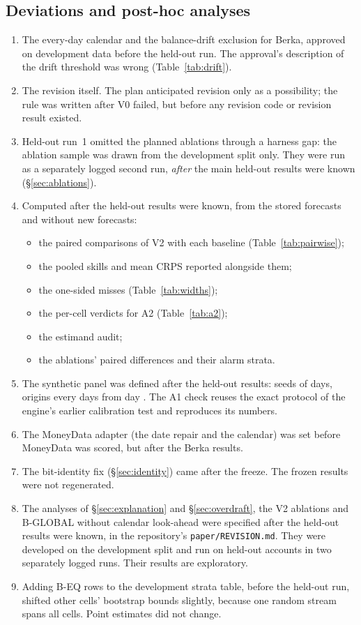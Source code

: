 \subsection{Deviations and post-hoc analyses}
\begin{enumerate}[label=(\arabic*)]
\item The every-day calendar and the balance-drift exclusion for Berka,
  approved on development data before the held-out run. The approval's
  description of the drift threshold was wrong (Table~\ref{tab:drift}).
\item The revision itself. The plan anticipated revision only as a
  possibility; the rule was written after V0 failed, but before any
  revision code or revision result existed.
\item Held-out run~1 omitted the planned ablations through a harness gap:
  the ablation sample was drawn from the development split only. They were
  run as a separately logged second run, \emph{after} the main held-out
  results were known (\S\ref{sec:ablations}).
\item Computed after the held-out results were known, from the stored
  forecasts and without new forecasts:
  \begin{itemize}
  \item the paired comparisons of V2 with each baseline
    (Table~\ref{tab:pairwise});
  \item the pooled skills and mean CRPS reported alongside them;
  \item the one-sided misses (Table~\ref{tab:widths});
  \item the per-cell verdicts for A2 (Table~\ref{tab:a2});
  \item the estimand audit;
  \item the ablations' paired differences and their alarm strata.
  \end{itemize}
\item The synthetic panel was defined after the held-out results:
   seeds of  days, origins every
   days from day . The A1 check
  reuses the exact protocol of the engine's earlier calibration test and
  reproduces its numbers.
\item The MoneyData adapter (the date repair and the calendar) was set
  before MoneyData was scored, but after the Berka results.
\item The bit-identity fix (\S\ref{sec:identity}) came after the freeze. The
  frozen results were not regenerated.
\item The analyses of \S\ref{sec:explanation} and \S\ref{sec:overdraft},
  the V2 ablations and B-GLOBAL without calendar look-ahead were specified
  after the held-out results were known, in the repository's
  \texttt{paper/REVISION.md}. They were developed on the development split
  and run on held-out accounts in two separately logged runs. Their
  results are exploratory.
\item Adding B-EQ rows to the development strata table, before the
  held-out run, shifted other cells' bootstrap bounds slightly, because one
  random stream spans all cells. Point estimates did not change.
\end{enumerate}
